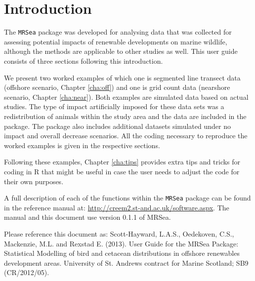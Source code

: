 \documentclass[11pt, a4paper]{report}
\begin{document}


\tableofcontents


\chapter{Introduction}
The {\tt MRSea} package was developed for analysing data that was collected for assessing potential impacts of renewable developments on marine wildlife, although the methods are applicable to other studies as well. This user guide consists of three sections following this introduction. 

\vspace{0.3cm}
We present two worked examples of which one is segmented line transect data (offshore scenario, Chapter \ref{cha:off}) and one is grid count data (nearshore scenario, Chapter \ref{cha:near}).  Both examples are simulated data based on actual studies. The type of impact artificially imposed for these data sets was a redistribution of animals within the study area and the data are included in the package. The package also includes additional datasets simulated under no impact and overall decrease scenarios. All the coding necessary to reproduce the worked examples is given in the respective sections. 

\vspace{0.3cm}
Following these examples, Chapter \ref{cha:tips} provides extra tips and tricks for coding in R that might be useful in case the user needs to adjust the code for their own purposes.

\vspace{0.3cm}
A full description of each of the functions within the {\tt MRSea} package can be found in the reference manual at: \href{http://creem2.st-and.ac.uk/software.aspx}{http://creem2.st-and.ac.uk/software.aspx}.  The manual and this document use version 0.1.1 of MRSea.

\vspace{0.3cm}
\begin{block}{Please reference this document as:}
\noindent Scott-Hayward, L.A.S., Oedekoven, C.S., Mackenzie, M.L. and Rexstad E. (2013). User Guide for the MRSea Package: Statistical Modelling of bird and cetacean distributions in offshore renewables development areas. University of St. Andrews contract for Marine Scotland; SB9 (CR/2012/05).
\end{block}

\newpage







\end{document}
